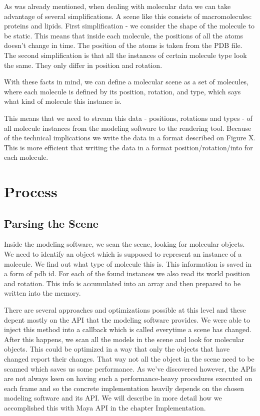 \documentclass[
  digital, %
  table,   %
  nolof,     %
  nolot,     %
]{fithesis3}
\begin{document}
As was already mentioned, when dealing with molecular data we can take advantage of several simplifications. A scene like this consists of macromolecules: proteins and lipids. First simplification - we consider the shape of the molecule to be static. This means that inside each molecule, the positions of all the atoms doesn't change in time. The position of the atoms is taken from the PDB file. The second simplification is that all the instances of certain molecule type look the same. They only differ in position and rotation.

With these facts in mind, we can define a molecular scene as a set of molecules, where each molecule is defined by its position, rotation, and type, which says what kind of molecule this instance is.

This means that we need to stream this data - positions, rotations and types - of all molecule instances from the modeling software to the rendering tool. Because of the technical implications we write the data in a format described on Figure X. This is more efficient that writing the data in a format position/rotation/into for each molecule.
\section{Process}
\subsection{Parsing the Scene}
Inside the modeling software, we scan the scene, looking for molecular objects. We need to identify an object which is supposed to represent an instance of a molecule. We find out what type of molecule this is. This information is saved in a form of pdb id. For each of the found instances we also read its world position and rotation. This info is accumulated into an array and then prepared to be written into the memory.

There are several approaches and optimizations possible at this level and these depent mostly on the API that the modeling software provides. We were able to inject this method into a callback which is called everytime a scene has changed. After this happens, we scan all the models in the scene and look for molecular objects. This could be optimized in a way that only the objects that have changed report their changes. That way not all the object in the scene need to be scanned which saves us some performance. As we've discovered however, the APIs are not always keen on having such a performance-heavy procedures executed on each frame and so the concrete implementation heavily depends on the chosen modeling software and its API. We will describe in more detail how we accomplished this with Maya API in the chapter Implementation.
\end{document}
